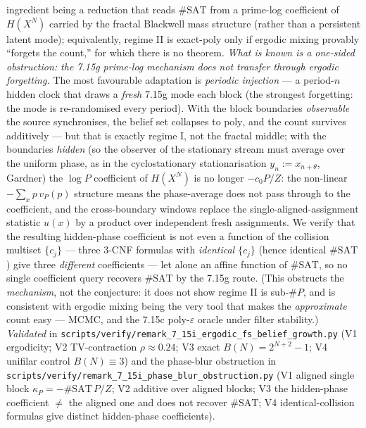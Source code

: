 \documentclass[
]{article}
\begin{document}
ingredient being a reduction that reads $\#\mathrm{SAT}$ from a prime-log coefficient of $H(X^N)$ carried
by the fractal Blackwell mass structure (rather than a persistent latent mode); equivalently, regime II
is exact-poly only if ergodic mixing provably ``forgets the count,'' for which there is no theorem.
\emph{What is known is a one-sided obstruction: the 7.15g prime-log mechanism does not transfer through
ergodic forgetting.} The most favourable adaptation is \emph{periodic injection} --- a period-$n$ hidden
clock that draws a \emph{fresh} 7.15g mode each block (the strongest forgetting: the mode is re-randomised
every period). With the block boundaries \emph{observable} the source synchronises, the belief set
collapses to $\mathrm{poly}$, and the count survives additively --- but that is exactly regime I, not the
fractal middle; with the boundaries \emph{hidden} (so the observer of the stationary stream must average
over the uniform phase, as in the cyclostationary stationarisation $y_n:=x_{n+\theta}$, Gardner) the
$\log P$ coefficient of $H(X^N)$ is no longer $-c_0P/Z$: the non-linear $-\sum_x p\,v_P(p)$ structure means
the phase-average does not pass through to the coefficient, and the cross-boundary windows replace the
single-aligned-assignment statistic $u(x)$ by a product over independent fresh assignments. We verify that
the resulting hidden-phase coefficient is not even a function of the collision multiset $\{c_j\}$ --- three
$3$-CNF formulas with \emph{identical} $\{c_j\}$ (hence identical $\#\mathrm{SAT}$) give three
\emph{different} coefficients --- let alone an affine function of $\#\mathrm{SAT}$, so no single coefficient
query recovers $\#\mathrm{SAT}$ by the 7.15g route. (This obstructs the \emph{mechanism}, not the
conjecture: it does not show regime II is sub-$\#P$, and is consistent with ergodic mixing being the very
tool that makes the \emph{approximate} count easy --- MCMC, and the 7.15c poly-$\varepsilon$ oracle under
filter stability.) \emph{Validated} in
\texttt{scripts/verify/remark\_7\_15i\_ergodic\_fs\_belief\_growth.py} (V1 ergodicity;
V2 TV-contraction $\rho\approx0.24$; V3 exact $B(N)=2^{N+2}-1$; V4 unifilar control $B(N)\equiv3$) and the
phase-blur obstruction in
\texttt{scripts/verify/remark\_7\_15i\_phase\_blur\_obstruction.py} (V1 aligned single block
$\kappa_P=-\#\mathrm{SAT}\,P/Z$; V2 additive over aligned blocks; V3 the hidden-phase coefficient $\neq$ the
aligned one and does not recover $\#\mathrm{SAT}$; V4 identical-collision formulas give distinct hidden-phase
coefficients).
\end{document}
